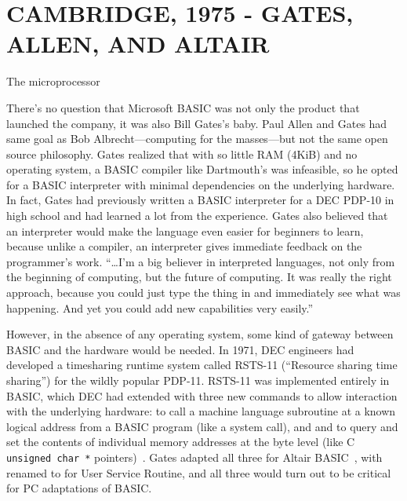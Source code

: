 
\section{CAMBRIDGE, 1975 - GATES, ALLEN, AND ALTAIR}

\begin{milestone}{The microprocessor}

\end{milestone}



There's no question that Microsoft BASIC was not only the product that
launched the company, it was also Bill Gates's baby.
Paul Allen and Gates had same goal as Bob Albrecht---computing for the
masses---but not the 
same open source philosophy.  Gates realized that with so little RAM
(4KiB)  and no operating system, a BASIC compiler like Dartmouth's was
infeasible, so he opted for a BASIC interpreter with minimal 
dependencies on the underlying hardware.
In fact, Gates had
previously written a BASIC interpreter for  a DEC PDP-10 in high school and
had learned a lot from the experience.
Gates also believed that an interpreter would make the language even
easier for beginners to learn, because unlike a compiler, 
an interpreter gives immediate feedback on the programmer's work.
``\ldots I'm a big believer in interpreted languages,
not only from the beginning of computing, but the future of
computing. It was really the right approach, because you could just type
the thing in and immediately see what was happening. And yet you could
add new capabilities very easily.'' ~\cite{smithsonian_interview}

However, in the absence of any operating system, some kind of gateway
between BASIC and the hardware would be needed.  
In 1971, DEC engineers had developed a timesharing runtime system called
RSTS-11 (``Resource sharing time sharing'') for the wildly popular
PDP-11.
RSTS-11 was implemented entirely in BASIC, 
which DEC had
extended with three new commands to allow interaction with the underlying
hardware:  to call a machine language subroutine at a known
logical address from a BASIC
program (like a system call), and 
 and  to query and set the contents of individual memory
addresses at the byte level (like C \texttt{unsigned char~*}
pointers)~\cite[pp.~204--205]{ceruzzi}. 
Gates adapted all three for Altair
BASIC~\cite{smithsonian_interview}, with  
renamed to  for User Service Routine, and
all three would turn out to be critical for PC adaptations of 
BASIC. 

